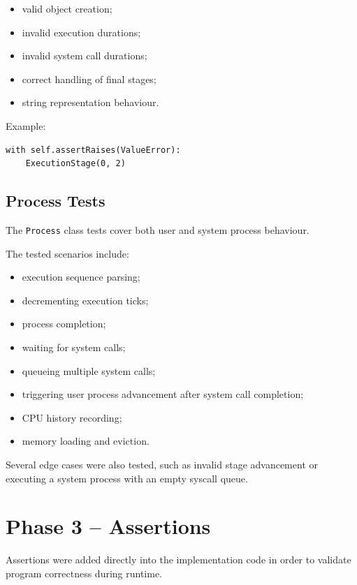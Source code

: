 \documentclass{article}
\begin{document}
\begin{itemize}
    \item valid object creation;
    \item invalid execution durations;
    \item invalid system call durations;
    \item correct handling of final stages;
    \item string representation behaviour.
\end{itemize}

Example:

\begin{verbatim}
with self.assertRaises(ValueError):
    ExecutionStage(0, 2)
\end{verbatim}



\subsection{Process Tests}

The \texttt{Process} class tests cover both user and system process behaviour.

The tested scenarios include:

\begin{itemize}
    \item execution sequence parsing;
    \item decrementing execution ticks;
    \item process completion;
    \item waiting for system calls;
    \item queueing multiple system calls;
    \item triggering user process advancement after system call completion;
    \item CPU history recording;
    \item memory loading and eviction.
\end{itemize}

Several edge cases were also tested, such as invalid stage advancement or executing a system process with an empty syscall queue.



\section{Phase 3 -- Assertions}

Assertions were added directly into the implementation code in order to validate program correctness during runtime.
\end{document}
